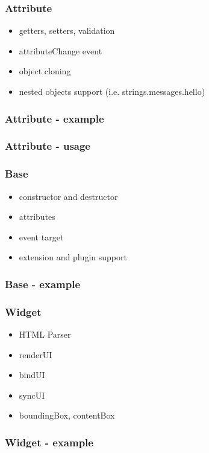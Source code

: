 \documentclass[16pt]{beamer}
\begin{document}
\begin{frame}
  \frametitle{Attribute}
  \begin{itemize}
  \item getters, setters, validation
  \item attributeChange event
  \item object cloning
  \item nested objects support (i.e. strings.messages.hello)
  \end{itemize}
\end{frame}

\begin{frame}[fragile]
  \frametitle{Attribute - example}
  
\end{frame}

\begin{frame}[fragile]
  \frametitle{Attribute - usage}
  
\end{frame}

\begin{frame}
  \frametitle{Base}
  \begin{itemize}
  \item constructor and destructor
  \item attributes
  \item event target
  \item extension and plugin support
  \end{itemize}
\end{frame}

\begin{frame}[fragile]
  \frametitle{Base - example}
  
\end{frame}

\begin{frame}
  \frametitle{Widget}
  \begin{itemize}
  \item HTML Parser
  \item renderUI
  \item bindUI
  \item syncUI
  \item boundingBox, contentBox
  \end{itemize}
\end{frame}

\begin{frame}[fragile]
  \frametitle{Widget - example}
  \begin{footnotesize}
    
  \end{footnotesize}
\end{frame}
\end{document}
